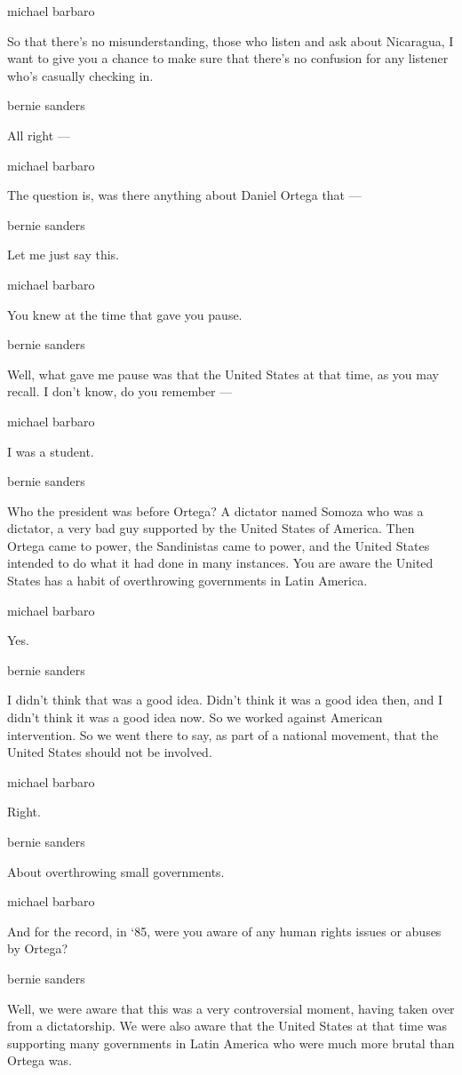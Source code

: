 michael barbaro

So that there's no misunderstanding, those who listen and ask about
Nicaragua, I want to give you a chance to make sure that there's no
confusion for any listener who's casually checking in.

bernie sanders

All right ---

michael barbaro

The question is, was there anything about Daniel Ortega that ---

bernie sanders

Let me just say this.

michael barbaro

You knew at the time that gave you pause.

bernie sanders

Well, what gave me pause was that the United States at that time, as you
may recall. I don't know, do you remember ---

michael barbaro

I was a student.

bernie sanders

Who the president was before Ortega? A dictator named Somoza who was a
dictator, a very bad guy supported by the United States of America. Then
Ortega came to power, the Sandinistas came to power, and the United
States intended to do what it had done in many instances. You are aware
the United States has a habit of overthrowing governments in Latin
America.

michael barbaro

Yes.

bernie sanders

I didn't think that was a good idea. Didn't think it was a good idea
then, and I didn't think it was a good idea now. So we worked against
American intervention. So we went there to say, as part of a national
movement, that the United States should not be involved.

michael barbaro

Right.

bernie sanders

About overthrowing small governments.

michael barbaro

And for the record, in `85, were you aware of any human rights issues or
abuses by Ortega?

bernie sanders

Well, we were aware that this was a very controversial moment, having
taken over from a dictatorship. We were also aware that the United
States at that time was supporting many governments in Latin America who
were much more brutal than Ortega was.

